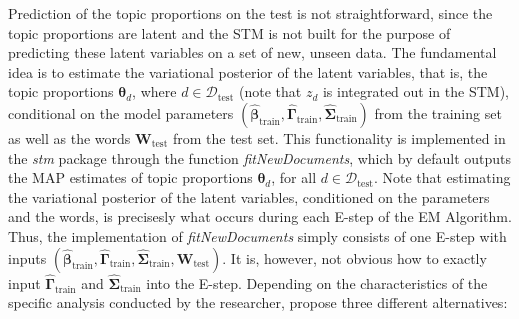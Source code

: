 Prediction of the topic proportions on the test is not straightforward, since the topic proportions are latent and the STM is not built for the purpose of predicting these latent variables on a set of new, unseen data. The fundamental idea is to estimate the variational posterior of the latent variables, that is, the topic proportions $\boldsymbol{\theta}_d$, where $d \in \mathcal{D}_{\text{test}}$ (note that $z_d$ is integrated out in the STM), conditional on the model parameters $(\hat{\boldsymbol{\beta}}_{\text{train}}, \hat{\boldsymbol{\Gamma}}_{\text{train}}, \hat{\boldsymbol{\Sigma}}_{\text{train}})$ from the training set as well as the words $\boldsymbol{W}_{\text{test}}$ from the test set. This functionality is implemented in the \textit{stm} package through the function \textit{fitNewDocuments}, which by default outputs the MAP estimates of topic proportions $\boldsymbol{\theta}_d$, for all $d \in \mathcal{D}_{\text{test}}$. Note that estimating the variational posterior of the latent variables, conditioned on the parameters and the words, is precisesly what occurs during each E-step of the EM Algorithm. Thus, the implementation of \textit{fitNewDocuments} simply consists of one E-step with inputs $(\hat{\boldsymbol{\beta}}_{\text{train}}, \hat{\boldsymbol{\Gamma}}_{\text{train}}, \hat{\boldsymbol{\Sigma}}_{\text{train}}, \boldsymbol{W}_{\text{test}})$. It is, however, not obvious how to exactly input $\hat{\boldsymbol{\Gamma}}_{\text{train}}$ and  $\hat{\boldsymbol{\Sigma}}_{\text{train}}$ into the E-step. Depending on the characteristics of the specific analysis conducted by the researcher, \cite{egami2018make} propose three different alternatives:

